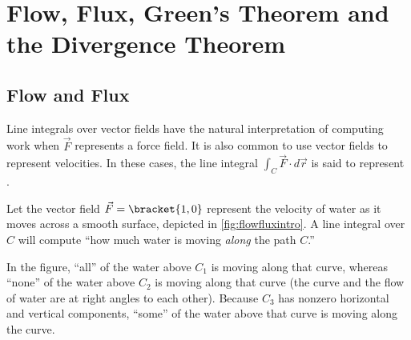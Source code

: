 \section{Flow, Flux, Green's Theorem and the Divergence Theorem}\label{sec:greensthm}

\subsection{Flow and Flux}


Line integrals over vector fields have the natural interpretation of computing work when $\vec F$ represents a force field. It is also common to use vector fields to represent velocities. In these cases, the line integral $\int_C \vec F\cdot d\vec r$ is said to represent .

Let the vector field $\vec F=\bracket{1,0}$ represent the velocity of water as it moves across a smooth surface, depicted in \autoref{fig:flowfluxintro}. A line integral over $C$ will compute ``how much water is moving \emph{along} the path $C$.'' 

In the figure, ``all'' of the water above $C_1$ is moving along that curve, whereas ``none'' of the water above $C_2$ is moving along that curve (the curve and the flow of water are at right angles to each other). Because $C_3$ has nonzero horizontal and vertical components, ``some'' of the water above that curve is moving along the curve.

